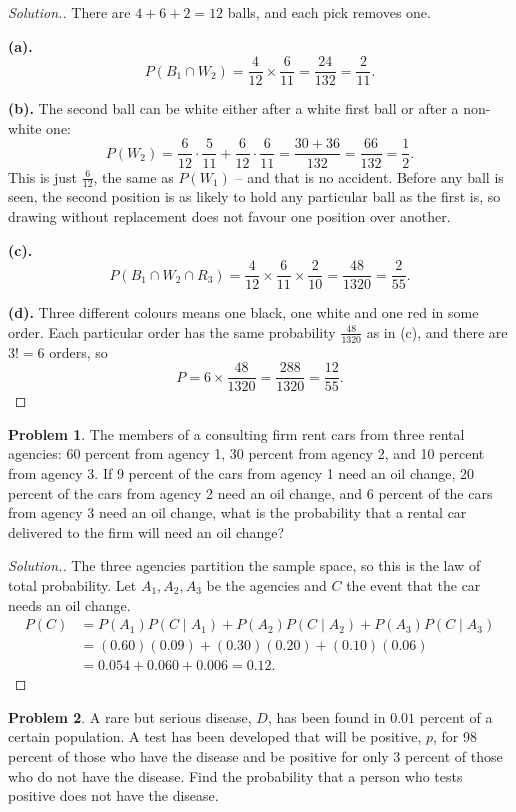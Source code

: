 \documentclass[12pt,a4paper]{report}
\theoremstyle{definition}
\theoremstyle{plain}
\theoremstyle{definition}
\newtheorem{problemx}{Problem}[section]
\newenvironment{problem}{\begin{problemx}}{\end{problemx}}
\newenvironment{solution}
  {\renewcommand{\qedsymbol}{}\begin{proof}[\textit{Solution}.]}
  {\end{proof}}
\begin{document}
\begin{solution}
There are $4+6+2=12$ balls, and each pick removes one.

\textbf{(a).} \[P(B_1\cap W_2) = \frac{4}{12}\times\frac{6}{11} = \frac{24}{132} = \frac{2}{11}.\]

\textbf{(b).} The second ball can be white either after a white first ball or after a
non-white one:
\[P(W_2) = \frac{6}{12}\cdot\frac{5}{11} + \frac{6}{12}\cdot\frac{6}{11}
 = \frac{30+36}{132} = \frac{66}{132} = \frac{1}{2}.\]
This is just $\tfrac{6}{12}$, the same as $P(W_1)$ -- and that is no accident. Before any
ball is seen, the second position is as likely to hold any particular ball as the first
is, so drawing without replacement does not favour one position over another.

\textbf{(c).} \[P(B_1\cap W_2\cap R_3) = \frac{4}{12}\times\frac{6}{11}\times\frac{2}{10}
 = \frac{48}{1320} = \frac{2}{55}.\]

\textbf{(d).} Three different colours means one black, one white and one red in some
order. Each particular order has the same probability $\tfrac{48}{1320}$ as in (c), and
there are $3!=6$ orders, so
\[P = 6\times\frac{48}{1320} = \frac{288}{1320} = \frac{12}{55}.\]
\end{solution}

\begin{problem}
The members of a consulting firm rent cars from three rental agencies: 60 percent from
agency 1, 30 percent from agency 2, and 10 percent from agency 3. If 9 percent of the
cars from agency 1 need an oil change, 20 percent of the cars from agency 2 need an oil
change, and 6 percent of the cars from agency 3 need an oil change, what is the
probability that a rental car delivered to the firm will need an oil change?
\end{problem}

\begin{solution}
The three agencies partition the sample space, so this is the law of total probability.
Let $A_1, A_2, A_3$ be the agencies and $C$ the event that the car needs an oil change.
\begin{align*}
P(C) &= P(A_1)P(C\mid A_1)+P(A_2)P(C\mid A_2)+P(A_3)P(C\mid A_3)\\
     &= (0.60)(0.09)+(0.30)(0.20)+(0.10)(0.06)\\
     &= 0.054+0.060+0.006 = 0.12.
\end{align*}
\end{solution}

\begin{problem}
A rare but serious disease, $D$, has been found in $0.01$ percent of a certain
population. A test has been developed that will be positive, $p$, for 98 percent of
those who have the disease and be positive for only 3 percent of those who do not have
the disease. Find the probability that a person who tests positive does not have the
disease.
\end{problem}
\end{document}
